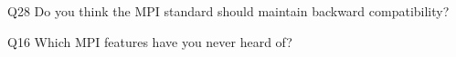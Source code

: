 \begin{description}%
\item{Q28} Do you think the MPI standard should maintain backward compatibility?%
\item{Q16} Which MPI features have you never heard of?%
\end{description}%
